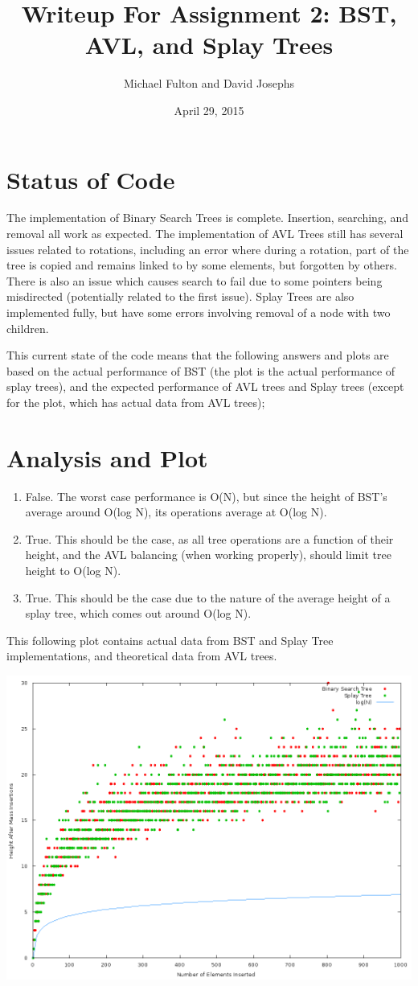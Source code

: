 \documentclass{article}
\author{Michael Fulton and David Josephs}
\date{April 29, 2015}
\title{Writeup For Assignment 2: BST, AVL, and Splay Trees}
\begin{document}
	\maketitle

	\section*{Status of Code}
		The implementation of Binary Search Trees is complete.  Insertion, searching, and removal all work as expected.  The implementation of AVL Trees still has several issues related to rotations, 
		including an error where during a rotation, part of the tree is copied and remains linked to by some elements, but forgotten by others.  There is also an issue which causes search to fail due to
		some pointers being misdirected (potentially related to the first issue).  Splay Trees are also implemented fully, but have some errors involving removal of a node with two children.

		This current state of the code means that the following answers and plots are based on the actual performance of BST (the plot is the actual performance of splay trees), and the expected performance of
		AVL trees and Splay trees (except for the plot, which has actual data from AVL trees);

	\section*{Analysis and Plot}
		\begin{enumerate}
			\item False. The worst case performance is O(N), but since the height of BST's average around O(log N), its operations average at O(log N).
			\item True. This should be the case, as all tree operations are a function of their height, and the AVL balancing (when working properly), should limit tree height to O(log N).
			\item True. This should be the case due to the nature of the average height of a splay tree, which comes out around O(log N).
		\end{enumerate}

		This following plot contains actual data from BST and Splay Tree implementations, and theoretical data from AVL trees.
		\clearpage
		
		\includegraphics[scale = 0.7]{plot.png}
		
\end{document}

